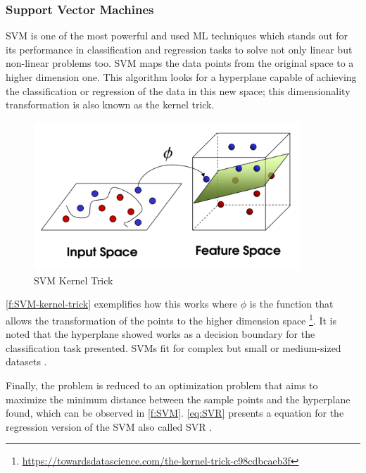 

\subsubsection{Support Vector Machines}

\ac{SVM} is one of the most powerful and used \ac{ML} techniques which stands out for its performance in classification and regression tasks to solve not only linear but non-linear problems too. \ac{SVM} maps the data points from the original space to a higher dimension one. This algorithm looks for a hyperplane capable of achieving the classification or regression of the data in this new space; this dimensionality transformation is also known as the kernel trick\cite{Batta2020}.

\begin{figure}[h]
\centering
\includegraphics[width=10cm]{figures/Ch2/SVM-KernelTrick.pdf}
\caption{SVM Kernel Trick}
\label{f:SVM-kernel-trick}
\end{figure}

\autoref{f:SVM-kernel-trick} exemplifies how this works where \begin{math}\phi\end{math} is the function that allows the transformation of the points to the higher dimension space \footnote{\url{https://towardsdatascience.com/the-kernel-trick-c98cdbcaeb3f}}. It is noted that the hyperplane showed works as a decision boundary for the classification task presented. \ac{SVM}s fit for complex but small or medium-sized datasets \cite{geron2017}.
 
Finally, the problem is reduced to an optimization problem that aims to maximize the minimum distance between the sample points and the hyperplane found, which can be observed in \autoref{f:SVM}. \autoref{eq:SVR} presents a equation for the regression version of the \ac{SVM} also called \ac{SVR} \cite{Ye2020}. 

